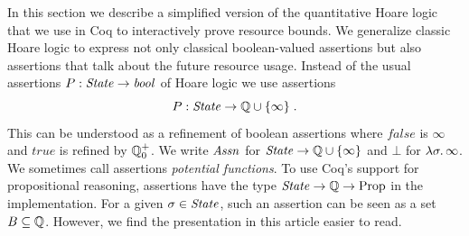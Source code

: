 \documentclass[nocopyrightspace,preprint,pldi]{sigplanconf-pldi15}
\begin{document}
{In this section we describe a simplified version of the quantitative
Hoare logic that we use in Coq to interactively prove resource bounds.
%
We generalize classic Hoare logic to express not only classical
boolean-valued assertions but also assertions that talk about the
future resource usage.  Instead of the usual assertions $P : \mathit{State}
\to \mathit{bool}$ of Hoare logic we use assertions
$$
P : \mathit{State} \to \mathbb{Q} \cup \{ \infty \} \; .
$$
This can be understood as a refinement of boolean assertions where
$\mathit{false}$ is $\infty$ and $\mathit{true}$ is refined by $\mathbb Q^+_0$.
We write $\mathit{Assn}$ for $\mathit{State} \to \mathbb{Q} \cup \{ \infty \}$ and $\bot$ for
$\lambda \sigma . \, \infty$.  We sometimes call assertions
\emph{potential functions}.  To use Coq's support for propositional
reasoning, assertions have the type $\mathit{State} \to \mathbb{Q} \to \mathrm{Prop}$
in the implementation.  For a given $\sigma \in \mathit{State}$, such an
assertion can be seen as a set $B \subseteq \mathbb{Q}$.  However, we find
the presentation in this article easier to read.

}
\end{document}
